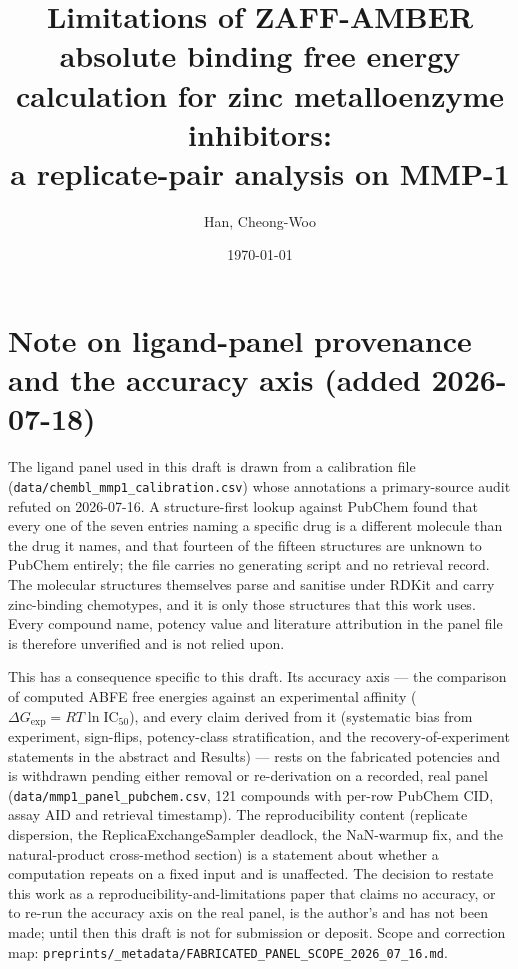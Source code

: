 \documentclass[11pt,a4paper]{article}
\title{Limitations of ZAFF-AMBER absolute binding free energy
calculation for zinc metalloenzyme inhibitors:\\
a replicate-pair analysis on MMP-1}
\author[1,2,3]{Han, Cheong-Woo}
\affil[1]{Genesis Medicine Lab, Seoul, Republic of Korea}
\affil[2]{HAN PREDICT, Inc., \href{https://hanpredict.com}{hanpredict.com}}
\affil[3]{Recover Korean Medicine Clinic, \href{https://recover-clinic.kr}{recover-clinic.kr}}
\date{\today}
\newcommand{\dG}{\Delta G}
\newcommand{\dGexp}{\dG_{\mathrm{exp}}}
\begin{document}
\maketitle

\section*{Note on ligand-panel provenance and the accuracy axis (added 2026-07-18)}

The ligand panel used in this draft is drawn from a calibration file
(\texttt{data/chembl\_mmp1\_calibration.csv}) whose annotations a primary-source audit refuted on
2026-07-16. A structure-first lookup against PubChem found that every one of the seven entries naming a
specific drug is a different molecule than the drug it names, and that fourteen of the fifteen structures
are unknown to PubChem entirely; the file carries no generating script and no retrieval record. The
molecular structures themselves parse and sanitise under RDKit and carry zinc-binding chemotypes, and it
is only those structures that this work uses. Every compound name, potency value and literature
attribution in the panel file is therefore unverified and is not relied upon.

This has a consequence specific to this draft. Its accuracy axis --- the comparison of computed ABFE free
energies against an experimental affinity ($\dGexp = RT \ln \mathrm{IC}_{50}$), and every claim derived
from it (systematic bias from experiment, sign-flips, potency-class stratification, and the
recovery-of-experiment statements in the abstract and Results) --- rests on the fabricated potencies and
is withdrawn pending either removal or re-derivation on a recorded, real panel
(\texttt{data/mmp1\_panel\_pubchem.csv}, 121 compounds with per-row PubChem CID, assay AID and retrieval
timestamp). The reproducibility content (replicate dispersion, the ReplicaExchangeSampler deadlock, the
NaN-warmup fix, and the natural-product cross-method section) is a statement about whether a computation
repeats on a fixed input and is unaffected. The decision to restate this work as a
reproducibility-and-limitations paper that claims no accuracy, or to re-run the accuracy axis on the real
panel, is the author's and has not been made; until then this draft is not for submission or deposit.
Scope and correction map: \texttt{preprints/\_metadata/FABRICATED\_PANEL\_SCOPE\_2026\_07\_16.md}.
\end{document}
